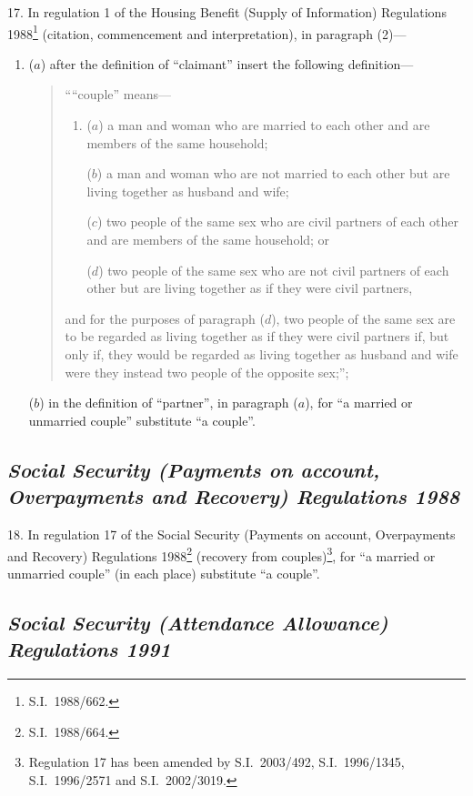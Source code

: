 \documentclass[12pt,a4paper]{article}
\begin{document}
17.  In regulation 1 of the Housing Benefit (Supply of Information) Regulations 1988\footnote{S.I.\ 1988/662.} (citation, commencement and interpretation), in paragraph (2)—
\begin{enumerate}\item[]
($a$) after the definition of “claimant” insert the following definition—
\begin{quotation}
““couple” means—
\begin{enumerate}\item[]
($a$) 
a man and woman who are married to each other and are members of the same household;

($b$) 
a man and woman who are not married to each other but are living together as husband and wife;

($c$) 
two people of the same sex who are civil partners of each other and are members of the same household; or

($d$) 
two people of the same sex who are not civil partners of each other but are living together as if they were civil partners,
\end{enumerate}
and for the purposes of paragraph ($d$), two people of the same sex are to be regarded as living together as if they were civil partners if, but only if, they would be regarded as living together as husband and wife were they instead two people of the opposite sex;”;
\end{quotation}

($b$) in the definition of “partner”, in paragraph ($a$), for “a married or unmarried couple” substitute “a couple”.
\end{enumerate}

\subsection*{\itshape Social Security (Payments on account, Overpayments and Recovery) Regulations 1988}

18.  In regulation 17 of the Social Security (Payments on account, Overpayments and Recovery) Regulations 1988\footnote{S.I.\ 1988/664.} (recovery from couples)\footnote{Regulation 17 has been amended by S.I.\ 2003/492, S.I.\ 1996/1345, S.I.\ 1996/2571 and S.I.\ 2002/3019.}, for “a married or unmarried couple” (in each place) substitute “a couple”.

\subsection*{\itshape\sloppy Social Security (Attendance Allowance) Regulations 1991}
\end{document}

